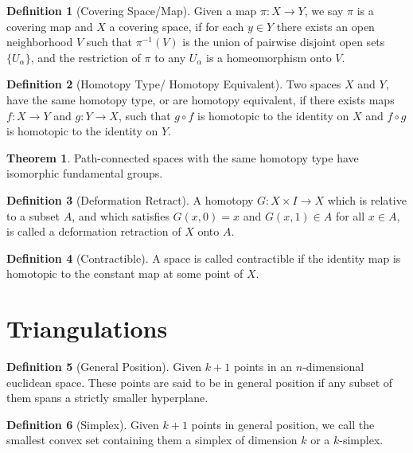 \documentclass{article}
\theoremstyle{definition}
\newtheorem{definition}{Definition}[section]
\newtheorem{theorem}{Theorem}[section]
\theoremstyle{remark}
\theoremstyle{remark}
\begin{document}
\begin{definition}[Covering Space/Map]
    Given a map $\pi: X \to Y$, we say $\pi$ is a covering map and $X$ a covering space, if for each $y \in Y$ there exists an open neighborhood $V$ such that $\pi^{-1}(V)$ is the union of pairwise disjoint open sets $\{U_{\alpha}\}$, and the restriction of $\pi$ to any $U_{\alpha}$ is a homeomorphism onto $V$. 
\end{definition}

\begin{definition}[Homotopy Type/ Homotopy Equivalent]
    Two spaces $X$ and $Y$, have the same homotopy type, or are homotopy equivalent, if there exists maps $f: X \to Y$ and $g: Y \to X$, such that $g\circ f$ is homotopic to the identity on $X$ and $f \circ g$ is homotopic to the identity on $Y$. 
\end{definition}

\begin{theorem}
    Path-connected spaces with the same homotopy type have isomorphic fundamental groups.
\end{theorem}

\begin{definition}[Deformation Retract]
    A homotopy $G: X \times I \to X$ which is relative to a subset $A$, and which satisfies $G(x, 0) = x$ and $G(x, 1) \in A$ for all $x \in A$, is called a deformation retraction of $X$ onto $A$. 
\end{definition}

\begin{definition}[Contractible]
    A space is called contractible if the identity map is homotopic to the constant map at some point of $X$.
\end{definition}

\section{Triangulations}
\begin{definition}[General Position]
    Given $k + 1$ points in an $n$-dimensional euclidean space. These points are said to be in general position if any subset of them spans a strictly smaller hyperplane.
\end{definition}

\begin{definition}[Simplex]
    Given $k+1$ points in general position, we call the smallest convex set containing them a simplex of dimension $k$ or a $k$-simplex.
\end{definition}
\end{document}

